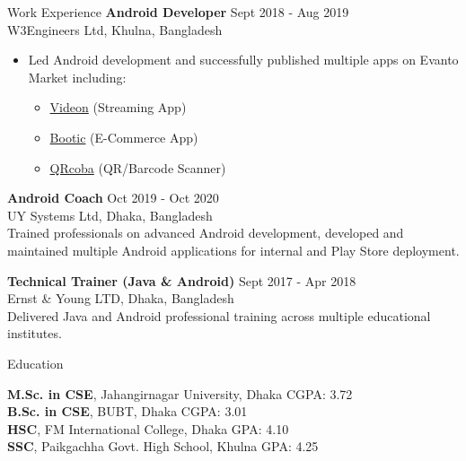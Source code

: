 \documentclass{resume}
\begin{document}
\begin{rSection}{Work Experience}
    {\bf Android Developer} \hfill Sept 2018 - Aug 2019\\
    W3Engineers Ltd, Khulna, Bangladesh
    \begin{itemize}
        \itemsep -2pt
        \item Led Android development and successfully published multiple apps on Evanto Market including:
        \begin{itemize}
            \item \href{https://codecanyon.net/item/videon-a-video-streaming-android-app-with-admin-panel/23466323}{Videon} (Streaming App)
            \item \href{https://codecanyon.net/item/bootic-an-android-ecommerce-app-with-admin-panel/22131989}{Bootic} (E-Commerce App)
            \item \href{https://codecanyon.net/item/qrcoba-a-qrbarcode-generator-and-scanner-android-app-with-admob/23127768}{QRcoba} (QR/Barcode Scanner)
        \end{itemize}
    \end{itemize}

    {\bf Android Coach} \hfill Oct 2019 - Oct 2020\\
    UY Systems Ltd, Dhaka, Bangladesh\\
    Trained professionals on advanced Android development, developed and maintained multiple Android applications for internal and Play Store deployment.

        {\bf Technical Trainer (Java \& Android)} \hfill Sept 2017 - Apr 2018\\
    Ernst \& Young LTD, Dhaka, Bangladesh\\
    Delivered Java and Android professional training across multiple educational institutes.

    \end{rSection}

    \begin{rSection}{Education}

        \textbf{M.Sc. in CSE}, Jahangirnagar University, Dhaka \hfill CGPA: 3.72\\[1em]
        \textbf{B.Sc. in CSE}, BUBT, Dhaka \hfill CGPA: 3.01\\[1em]
        \textbf{HSC}, FM International College, Dhaka \hfill GPA: 4.10\\[1em]
        \textbf{SSC}, Paikgachha Govt. High School, Khulna \hfill GPA: 4.25

    \end{rSection}
\end{document}

